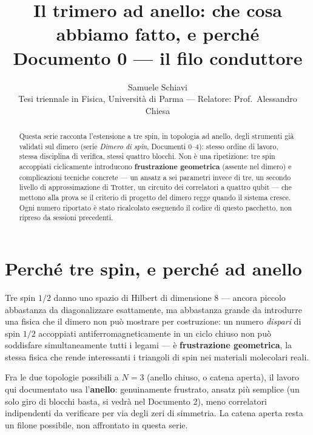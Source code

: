 \documentclass[11pt,a4paper]{article}
\title{\bfseries Il trimero ad anello: che cosa abbiamo fatto, e perché\\[2pt]
\large Documento 0 --- il filo conduttore}
\author{Samuele Schiavi \\ \small Tesi triennale in Fisica, Università di Parma
--- Relatore: Prof.\ Alessandro Chiesa}
\date{}
\begin{document}
\maketitle
\thispagestyle{fancy}

\begin{abstract}
\noindent
Questa serie racconta l'estensione a tre spin, in topologia ad anello, degli
strumenti già validati sul dimero (serie \emph{Dimero di spin}, Documenti 0--4):
stesso ordine di lavoro, stessa disciplina di verifica, stessi quattro blocchi.
Non è una ripetizione: tre spin accoppiati ciclicamente introducono
\textbf{frustrazione geometrica} (assente nel dimero) e complicazioni tecniche
concrete --- un ansatz a sei parametri invece di tre, un secondo livello di
approssimazione di Trotter, un circuito dei correlatori a quattro qubit --- che
mettono alla prova se il criterio di progetto del dimero regge quando il
sistema cresce. Ogni numero riportato è stato ricalcolato eseguendo il codice
di questo pacchetto, non ripreso da sessioni precedenti.
\end{abstract}

\section{Perché tre spin, e perché ad anello}

Tre spin $1/2$ danno uno spazio di Hilbert di dimensione $8$ --- ancora
piccolo abbastanza da diagonalizzare esattamente, ma abbastanza grande da
introdurre una fisica che il dimero non può mostrare per costruzione: un
numero \emph{dispari} di spin $1/2$ accoppiati antiferromagneticamente in un
ciclo chiuso non può soddisfare simultaneamente tutti i legami --- è
\textbf{frustrazione geometrica}, la stessa fisica che rende interessanti i
triangoli di spin nei materiali molecolari reali.

Fra le due topologie possibili a $N=3$ (anello chiuso, o catena aperta), il
lavoro qui documentato usa l'\textbf{anello}: genuinamente frustrato, ansatz
più semplice (un solo giro di blocchi basta, si vedrà nel Documento 2), meno
correlatori indipendenti da verificare per via degli zeri di simmetria. La
catena aperta resta un filone possibile, non affrontato in questa serie.

\end{document}
